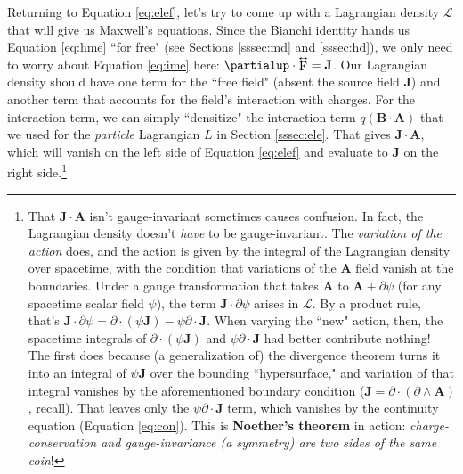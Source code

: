 \documentclass[12pt]{article}
\renewcommand{\vv}[1]{\mathbf{#1}}
\newcommand{\tightoverset}[2]{%
  \mathop{#2}\limits^{\vbox to -.5ex{\kern-0.75ex\hbox{$#1$}\vss}}}
\newcommand{\inlinedy}[1]{\tightoverset{\text{\tiny$\bm\leftrightarrow$}}{#1}}
\begin{document}
Returning to Equation \ref{eq:elef}, let's try to come up with a Lagrangian density $\mathcal{L}$ that will give us Maxwell's equations. Since the Bianchi identity hands us Equation \ref{eq:hme} ``for free" (see Sections \ref{sssec:md} and \ref{sssec:hd}), we only need to worry about Equation \ref{eq:ime} here: $\partialup \cdot \inlinedy{\mathrm{F}} = \vv J$. Our Lagrangian density should have one term for the ``free field" (absent the source field $\vv J$) and another term that accounts for the field's interaction with charges. For the interaction term, we can simply ``densitize" the interaction term $q (\vv B \cdot \vv A)$ that we used for the \emph{particle} Lagrangian $L$ in Section \ref{sssec:ele}. That gives $\vv J \cdot \vv A$, which will vanish on the left side of Equation \ref{eq:elef} and evaluate to $\vv J$ on the right side.\footnote{That $\vv J \cdot \vv A$ isn't gauge-invariant sometimes causes confusion. In fact, the Lagrangian density doesn't \emph{have} to be gauge-invariant. The \emph{variation of the action} does, and the action is given by the integral of the Lagrangian density over spacetime, with the condition that variations of the $\vv A$ field vanish at the boundaries. Under a gauge transformation that takes $\vv A$ to $\vv A + \partialup \psi$ (for any spacetime scalar field $\psi$), the term $\vv J \cdot \partialup \psi$ arises in $\mathcal{L}$. By a product rule, that's $\vv J \cdot \partialup \psi = \partialup \cdot (\psi \vv J) - \psi \partialup \cdot \vv J$. When varying the ``new" action, then, the spacetime integrals of $\partialup \cdot (\psi \vv J)$ and $\psi \partialup \cdot \vv J$ had better contribute nothing! The first does because (a generalization of) the divergence theorem turns it into an integral of $\psi \vv J$ over the bounding ``hypersurface," and variation of that integral vanishes by the aforementioned boundary condition ($\vv J = \partialup \cdot (\partialup \wedge \vv A)$, recall). That leaves only the $\psi \partialup \cdot \vv J$ term, which vanishes by the continuity equation (Equation \ref{eq:con}). This is \textbf{Noether's theorem} in action: \emph{charge-conservation and gauge-invariance (a symmetry) are two sides of the same coin}!}
\end{document}
